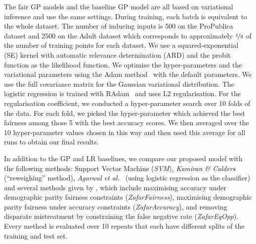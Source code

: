 The fair GP models and the baseline GP model are all based on variational inference and use the same settings.
During training, each batch is equivalent to the whole dataset.
The number of inducing inputs is 500 on the ProPublica dataset
and 2500 on the Adult dataset
which corresponds to approximately $\nicefrac{1}{8}$ of the number of training points for each dataset.
We use a squared-exponential (SE) kernel with automatic relevance determination (ARD)
and the probit function as the likelihood function.
We optimise the hyper-parameters and the variational parameters
using the Adam method~\citep{kingma2015adam} with the default parameters. %
We use the full covariance matrix for the Gaussian variational distribution.
%
The logistic regression is trained with RAdam~\citep{liu2019variance} and uses L2 regularisation.
For the regularisation coefficient, we conducted a hyper-parameter search over 10 folds of the data.
For each fold, we picked the hyper-parameter which achieved the best fairness among those 5 with
the best accuracy scores.
We then averaged over the 10 hyper-parameter values chosen in this way and then used this average for all runs to obtain our final results.

In addition to the GP and LR baselines, we compare our proposed model with the following methods:
Support Vector Machine (\emph{SVM}), \emph{Kamiran \& Calders}~\citep{kamiran2012data} (``reweighing'' method),
\emph{Agarwal et al.}~\citep{AgaBeyDudLanetal18} (using logistic regression as the classifier)
and several methods given by \citet{zafar2017fairnessconstraints,zafar2017fairnesstreatment},
which include maximising accuracy under demographic parity fairness constraints (\emph{ZafarFairness}),
maximising demographic parity fairness under accuracy constraints (\emph{ZafarAccuracy}),
and removing disparate mistreatment by constraining the false negative rate (\emph{ZafarEqOpp}).
Every method is evaluated over 10 repeats that each have different splits of the training and test set.

